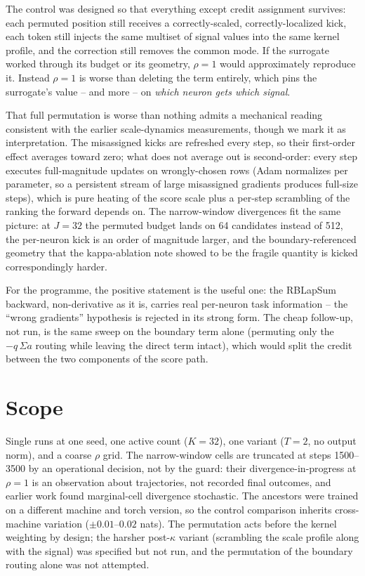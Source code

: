 \documentclass[11pt,a4paper]{article}
\begin{document}
The control was designed so that everything except credit assignment
survives: each permuted position still receives a correctly-scaled,
correctly-localized kick, each token still injects the same multiset of
signal values into the same kernel profile, and the correction still removes
the common mode. If the surrogate worked through its budget or its geometry,
$\rho = 1$ would approximately reproduce it. Instead $\rho = 1$ is worse
than deleting the term entirely, which pins the surrogate's value -- and
more -- on \emph{which neuron gets which signal}.

That full permutation is worse than nothing admits a mechanical reading
consistent with the earlier scale-dynamics measurements, though we mark it
as interpretation. The misassigned kicks are refreshed every step, so their
first-order effect averages toward zero; what does not average out is
second-order: every step executes full-magnitude updates on wrongly-chosen
rows (Adam normalizes per parameter, so a persistent stream of large
misassigned gradients produces full-size steps), which is pure heating of
the score scale plus a per-step scrambling of the ranking the forward
depends on. The narrow-window divergences fit the same picture: at
$J = 32$ the permuted budget lands on 64 candidates instead of 512, the
per-neuron kick is an order of magnitude larger, and the boundary-referenced
geometry that the kappa-ablation note showed to be the fragile quantity is
kicked correspondingly harder.

For the programme, the positive statement is the useful one: the RBLapSum
backward, non-derivative as it is, carries real per-neuron task information
-- the ``wrong gradients'' hypothesis is rejected in its strong form. The
cheap follow-up, not run, is the same sweep on the boundary term alone
(permuting only the $-q\,\Sigma a$ routing while leaving the direct term
intact), which would split the credit between the two components of the
score path.

\section{Scope}

Single runs at one seed, one active count ($K = 32$), one variant ($T = 2$,
no output norm), and a coarse $\rho$ grid. The narrow-window cells are
truncated at steps 1500--3500 by an operational decision, not by the guard:
their divergence-in-progress at $\rho = 1$ is an observation about
trajectories, not recorded final outcomes, and earlier work found
marginal-cell divergence stochastic. The ancestors were trained on a
different machine and torch version, so the control comparison inherits
cross-machine variation ($\pm 0.01$--$0.02$ nats). The permutation acts
before the kernel weighting by design; the harsher post-$\kappa$ variant
(scrambling the scale profile along with the signal) was specified but not
run, and the permutation of the boundary routing alone was not attempted.
\end{document}

